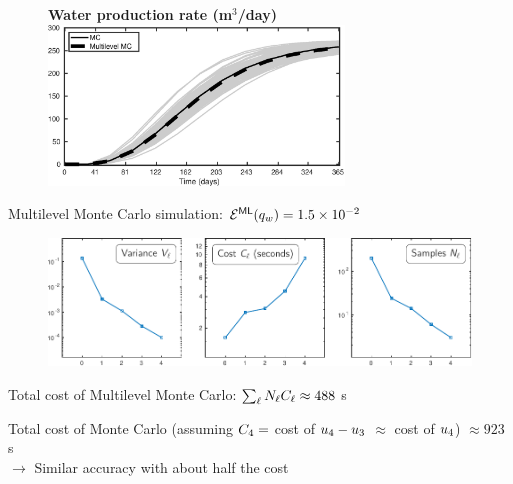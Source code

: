 \begin{frame}{\name{}}
    \begin{figure}
        \centering
        \textbf{Water production rate (m$^3$/day)}
        \includegraphics[width = 0.7\textwidth]{figures/example-1/water-rate-ml.eps}
    \end{figure}
    \begin{squarelist}
        \item Multilevel Monte Carlo simulation: $\mathcal{E}^{\mathsf{ML}}(q_w) = 1.5\times10^{-2}$
    \end{squarelist}
\end{frame}

\begin{frame}{\name{}}
    \begin{figure}
        \centering
        \includegraphics[width = \textwidth]{figures/example-1/statistics/ex1-statistics.pdf}
    \end{figure}
    \begin{squarelist}
        \item<2-> Total cost of Multilevel Monte Carlo: $\sum_\ell N_\ell C_\ell \approx 488$ s
        \item<3-> Total cost of Monte Carlo (assuming $C_4 = $ cost of $u_4 -u_3$ $\approx$ cost of $u_4$) $\approx 923$ s\\
        $\rightarrow$ Similar accuracy with about half the cost
    \end{squarelist}
\end{frame}











